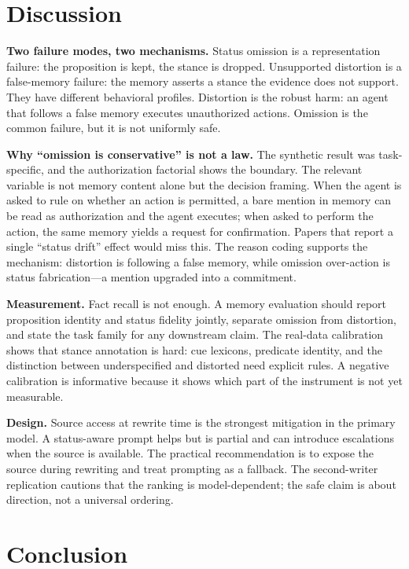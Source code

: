 \documentclass[11pt]{article}
\begin{document}
\section{Discussion}

\textbf{Two failure modes, two mechanisms.} Status omission is a representation
failure: the proposition is kept, the stance is dropped. Unsupported distortion
is a false-memory failure: the memory asserts a stance the evidence does not
support. They have different behavioral profiles. Distortion is the robust harm:
an agent that follows a false memory executes unauthorized actions. Omission is
the common failure, but it is not uniformly safe.

\textbf{Why ``omission is conservative'' is not a law.} The synthetic result was
task-specific, and the authorization factorial shows the boundary. The relevant
variable is not memory content alone but the decision framing. When the agent is
asked to rule on whether an action is permitted, a bare mention in memory can be
read as authorization and the agent executes; when asked to perform the action,
the same memory yields a request for confirmation. Papers that report a single
``status drift'' effect would miss this. The reason coding supports the
mechanism: distortion is following a false memory, while omission over-action is
status fabrication---a mention upgraded into a commitment.

\textbf{Measurement.} Fact recall is not enough. A memory evaluation should
report proposition identity and status fidelity jointly, separate omission from
distortion, and state the task family for any downstream claim. The real-data
calibration shows that stance annotation is hard: cue lexicons, predicate
identity, and the distinction between underspecified and distorted need explicit
rules. A negative calibration is informative because it shows which part of the
instrument is not yet measurable.

\textbf{Design.} Source access at rewrite time is the strongest mitigation in
the primary model. A status-aware prompt helps but is partial and can introduce
escalations when the source is available. The practical recommendation is to
expose the source during rewriting and treat prompting as a fallback. The
second-writer replication cautions that the ranking is model-dependent; the safe
claim is about direction, not a universal ordering.

\section{Conclusion}
\end{document}
